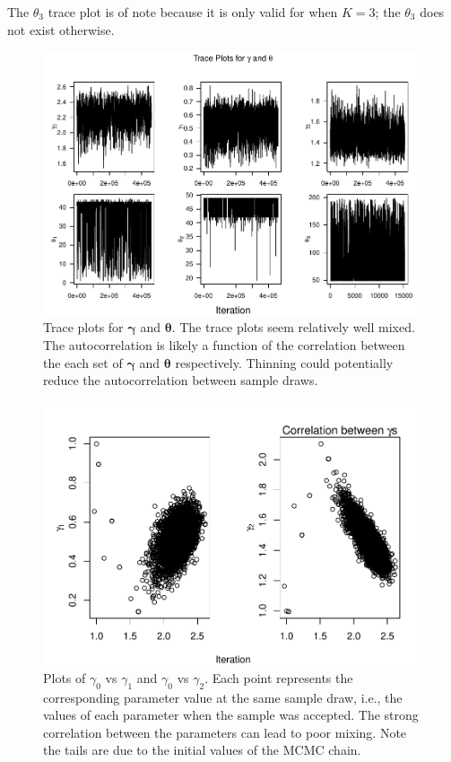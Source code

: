 \documentclass[]{article}
\numberwithin{equation}{section}
\begin{document}
The \(\theta_3\) trace plot is of note because it is only valid for when
\(K = 3\); the \(\theta_3\) does not exist otherwise.

\begin{figure}
\centering
\includegraphics{thesis_draft_files/figure-latex/unnamed-chunk-2-1.pdf}
\caption{\label{fig:lam_trace}Trace plots for \(\boldsymbol{\gamma}\)
and \(\boldsymbol{\theta}\). The trace plots seem relatively well mixed.
The autocorrelation is likely a function of the correlation between the
each set of \(\boldsymbol{\gamma}\) and \(\boldsymbol{\theta}\)
respectively. Thinning could potentially reduce the autocorrelation
between sample draws.}
\end{figure}

\begin{figure}
\centering
\includegraphics{thesis_draft_files/figure-latex/cor_gammas-1.pdf}
\caption{Plots of \(\gamma_0\) vs \(\gamma_1\) and \(\gamma_0\) vs
\(\gamma_2\). Each point represents the corresponding parameter value at
the same sample draw, i.e., the values of each parameter when the sample
was accepted. The strong correlation between the parameters can lead to
poor mixing. Note the tails are due to the initial values of the MCMC
chain.}
\end{figure}
\end{document}
